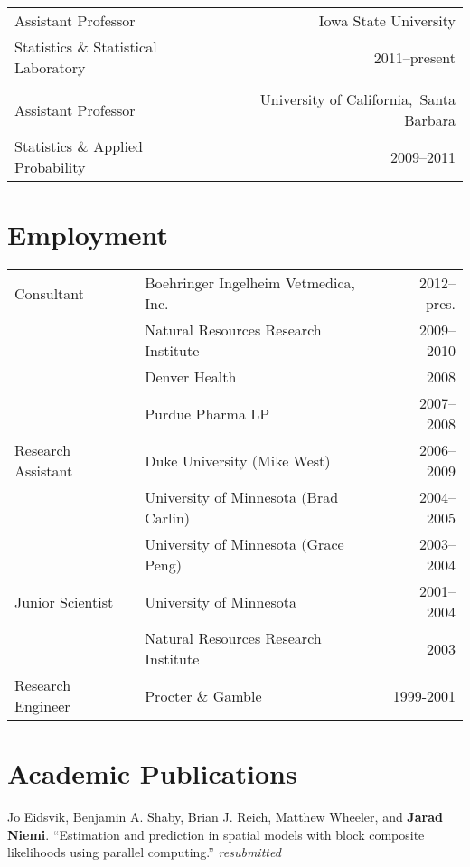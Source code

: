 \documentclass[overlapped,line,letterpaper]{res}
\begin{document}
\begin{resume}
\begin{tabular}{l@{\qquad}r}
Assistant Professor & Iowa State University \\
Statistics \& Statistical Laboratory & 2011--present \\
\\
Assistant Professor & University of California,\ Santa Barbara \\
Statistics \& Applied Probability & 2009--2011
\end{tabular}


\section{\bf Employment}

\begin{tabular}{l@{\qquad}l@{\qquad}r}
Consultant & Boehringer Ingelheim Vetmedica, Inc. & 2012--pres. \\
 & Natural Resources Research Institute  & 2009--2010 \\
 & Denver Health & 2008 \\
 & Purdue Pharma LP & 2007--2008 \\
Research Assistant & Duke University (Mike West) & 2006--2009 \\
 & University of Minnesota (Brad Carlin) & 2004--2005 \\
 & University of Minnesota (Grace Peng) & 2003--2004 \\
Junior Scientist & University of Minnesota & 2001--2004 \\
 & Natural Resources Research Institute & 2003 \\
Research Engineer & Procter \& Gamble & 1999-2001
\end{tabular}


\section{\bf Academic Publications}

Jo Eidsvik, Benjamin A. Shaby, Brian J. Reich, Matthew Wheeler, and {\bf Jarad Niemi}. ``Estimation and prediction in spatial models with block composite likelihoods using parallel computing.'' \emph{resubmitted}



\end{resume}
\end{document}
